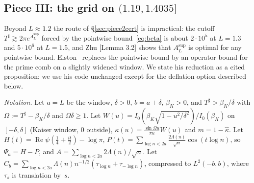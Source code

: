 \documentclass[11pt]{amsart}
\newcommand{\re}{\operatorname{Re}}
\newcommand{\Tsh}{T^{\sharp}}
\theoremstyle{definition}
\theoremstyle{remark}
\numberwithin{equation}{section}
\begin{document}
\subsection{Piece III: the grid on $(1.19,1.4035]$}\label{sec:piece3}
Beyond $L\approx1.2$ the route of \S\ref{sec:piece2cert} is impractical: the cutoff $\Tsh\gtrsim2\pi e^{A_L^{\sup}}$ forced by the pointwise bound~\eqref{eq:beta} is about $2\cdot10^5$ at $L=1.3$ and $5\cdot10^6$ at $L=1.5$, and Zhu [Lemma 3.2] shows that $A_L^{\sup}$ is optimal for any pointwise bound. Elston~\cite{Elston} replaces the pointwise bound by an operator bound for the prime comb on a slightly widened window. We state his reduction as a cited proposition; we use his code unchanged except for the deflation option described below.

\emph{Notation.} Let $a=L$ be the window, $\delta>0$, $b=a+\delta$, $\beta_K>0$, and $\Tsh>\beta_K/\delta$ with $\Omega:=\Tsh-\beta_K/\delta$ and $\Omega\delta\ge1$. Let $W(u)=I_0(\beta_K\sqrt{1-u^2/\delta^2})/I_0(\beta_K)$ on $[-\delta,\delta]$ (Kaiser window, $0$ outside), $\kappa(u)=\frac{\sin\Omega u}{\pi u}W(u)$ and $m=1-\hat\kappa$. Let $H(t)=\re\psi(\tfrac14+\tfrac{it}2)-\log\pi$, $P(t)=\sum_{\log n<2a}\frac{2\Lambda(n)}{\sqrt n}\cos(t\log n)$, so $\Psi_a=H-P$, and $A=\sum_{\log n<2a}2\Lambda(n)/\sqrt n$. Let $C_b=\sum_{\log n<2a}\Lambda(n)n^{-1/2}(\tau_{\log n}+\tau_{-\log n})$, compressed to $L^2(-b,b)$, where $\tau_s$ is translation by~$s$.
\end{document}
